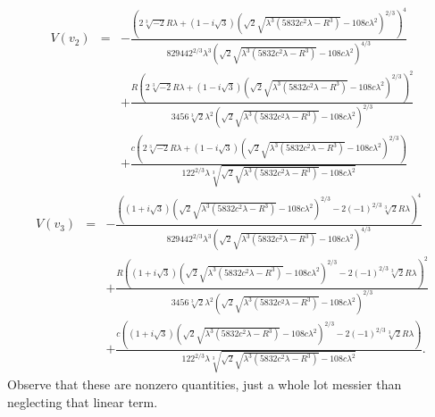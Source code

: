 \begin{eqnarray*}
V(v_2) &=& -\frac{\left(2 \sqrt[3]{-2} R \lambda +\left(1-i \sqrt{3}\right)
    \left(\sqrt{2} \sqrt{\lambda ^3 \left(5832 c^2 \lambda -R^3\right)}-108 c
    \lambda ^2\right)^{2/3}\right)^4}{82944 2^{2/3} \lambda ^3 \left(\sqrt{2}
    \sqrt{\lambda ^3 \left(5832 c^2 \lambda -R^3\right)}-108 c \lambda
    ^2\right)^{4/3}} \\
& & +\frac{R \left(2 \sqrt[3]{-2} R \lambda +\left(1-i
    \sqrt{3}\right) \left(\sqrt{2} \sqrt{\lambda ^3 \left(5832 c^2 \lambda
    -R^3\right)}-108 c \lambda ^2\right)^{2/3}\right)^2}{3456 \sqrt[3]{2}
    \lambda ^2 \left(\sqrt{2} \sqrt{\lambda ^3 \left(5832 c^2 \lambda
    -R^3\right)}-108 c \lambda ^2\right)^{2/3}} \\
& & +\frac{c \left(2 \sqrt[3]{-2} R
    \lambda +\left(1-i \sqrt{3}\right) \left(\sqrt{2} \sqrt{\lambda ^3
    \left(5832 c^2 \lambda -R^3\right)}-108 c \lambda
    ^2\right)^{2/3}\right)}{12 2^{2/3} \lambda  \sqrt[3]{\sqrt{2}
    \sqrt{\lambda ^3 \left(5832 c^2 \lambda -R^3\right)}-108 c \lambda ^2}}
\end{eqnarray*}
\begin{eqnarray*}
V(v_{3}) &=& -\frac{\left(\left(1+i \sqrt{3}\right) \left(\sqrt{2} \sqrt{\lambda ^3
    \left(5832 c^2 \lambda -R^3\right)}-108 c \lambda ^2\right)^{2/3}-2
    (-1)^{2/3} \sqrt[3]{2} R \lambda \right)^4}{82944 2^{2/3} \lambda ^3
    \left(\sqrt{2} \sqrt{\lambda ^3 \left(5832 c^2 \lambda -R^3\right)}-108 c
    \lambda ^2\right)^{4/3}} \\ 
& &+\frac{R \left(\left(1+i \sqrt{3}\right)
    \left(\sqrt{2} \sqrt{\lambda ^3 \left(5832 c^2 \lambda -R^3\right)}-108 c
    \lambda ^2\right)^{2/3}-2 (-1)^{2/3} \sqrt[3]{2} R \lambda \right)^2}{3456
    \sqrt[3]{2} \lambda ^2 \left(\sqrt{2} \sqrt{\lambda ^3 \left(5832 c^2
    \lambda -R^3\right)}-108 c \lambda ^2\right)^{2/3}} \\
& &+\frac{c
    \left(\left(1+i \sqrt{3}\right) \left(\sqrt{2} \sqrt{\lambda ^3 \left(5832
    c^2 \lambda -R^3\right)}-108 c \lambda ^2\right)^{2/3}-2 (-1)^{2/3}
    \sqrt[3]{2} R \lambda \right)}{12 2^{2/3} \lambda  \sqrt[3]{\sqrt{2}
    \sqrt{\lambda ^3 \left(5832 c^2 \lambda -R^3\right)}-108 c \lambda ^2}}.
\end{eqnarray*}
Observe that these are nonzero quantities, just a whole lot messier
than neglecting that linear term.
